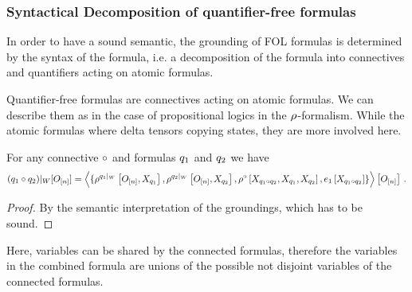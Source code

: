 %		



\subsubsection{Syntactical Decomposition of quantifier-free formulas}

In order to have a sound semantic, the grounding of FOL formulas is determined by the syntax of the formula, i.e. a decomposition of the formula into connectives and quantifiers acting on atomic formulas.

Quantifier-free formulas are connectives acting on atomic formulas.
We can describe them as in the case of propositional logics in the $\rho^{}$-formalism.
While the atomic formulas where delta tensors copying states, they are more involved here.



\begin{theorem}
	For any connective $\circ$ and formulas $q_1$ and $q_2$ we have
	\begin{align}
		{(q_1\circ q_2)}|_{W}[O_{[n]}] = 
			\left\langle \{
			\rho^{{q_1}|_{W}}\left[O_{[n]},X_{q_1}\right],
			\rho^{{q_2}|_{W}}\left[O_{[n]},X_{q_2}\right],
			\rho^{\circ}\left[X_{q_1\circ q_2}, X_{q_1}, X_{q_2}\right], 
			e_{1}\left[X_{q_1\circ q_2}\right]			
			\}\right\rangle \left[ O_{[n]} \right] \, . 
	\end{align}
\end{theorem}
\begin{proof}
	By the semantic interpretation of the groundings, which has to be sound.
\end{proof}

Here, variables can be shared by the connected formulas, therefore the variables in the combined formula are unions of the possible not disjoint variables of the connected formulas.


